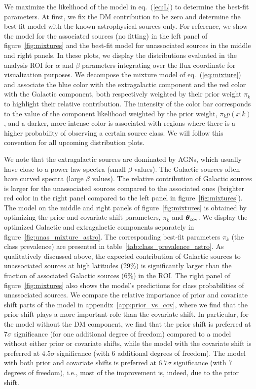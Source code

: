 We maximize the likelihood of the model in eq.~(\ref{eq:L}) to determine the best-fit parameters.
At first, we fix the DM contribution to be zero and determine the best-fit model with the known astrophysical sources only.
For reference, we show the model for the associated sources (no fitting) in the left panel of figure~\ref{fig:mixtures} and the best-fit model for unassociated sources in the middle and right panels.
In these plots, we display the distributions evaluated in the analysis ROI for $\alpha$ and $\beta$ parameters integrating over the flux coordinate for visualization purposes. We decompose the mixture model of eq.~(\ref{eq:mixture}) and associate the blue color with the extragalactic component and the red color with the Galactic component, both respectively weighted by their prior weight $\pi_k$ to highlight their relative contribution. The intensity of the color bar corresponds to the value of the component likelihood weighted by the prior weight, $\pi_k p(x | k)$, and a darker, more intense color is associated with regions where there is a higher probability of observing a certain source class. We will follow this convention for all upcoming distribution plots.

We note that the extragalactic sources are dominated by AGNs, which usually have close to a power-law spectra (small $\beta$ values).
The Galactic sources often have curved spectra (large $\beta$ values).
The relative contribution of Galactic sources is larger for the unassociated sources compared to the associated ones (brighter red color in the right panel compared to the left panel in figure~\ref{fig:mixtures}).
The model on the middle and right panels of figure~\ref{fig:mixtures} is obtained by optimizing the prior and covariate shift parameters, $\pi_k$ and $\boldsymbol{\theta}_{\rm cov}$.
We display the optimized Galactic and extragalactic components separately in figure~\ref{fig:unas_mixture_astro}.
The corresponding best-fit parameters $\pi_k$ (the class prevalence) are presented in table~\ref{tab:class_prevalence_astro}. 
As qualitatively discussed above, the expected contribution of Galactic sources to unassociated sources at high latitudes (29\%) is significantly larger than the fraction of associated Galactic sources (6\%) in the ROI.
The right panel of figure~\ref{fig:mixtures} also shows the model's predictions for class probabilities of unassociated sources. 
{
We compare the relative importance of prior and covariate shift parts of the model in appendix~\ref{app:prior_vs_cov}, where
we find that the prior shift plays a more important role than the covariate shift.
In particular, for the model without the DM component, we find that the prior shift is preferred at $7\sigma$ significance (for one additional degree of freedom) compared to a model without either prior or covariate shifts, while the model with the covariate shift is preferred at $4.5\sigma$ significance (with 6 additional degrees of freedom). The model with both prior and covariate shifts is preferred at $6.7\sigma$ significance (with 7 degrees of freedom), i.e., most of the improvement is, indeed, due to the prior shift.
}


